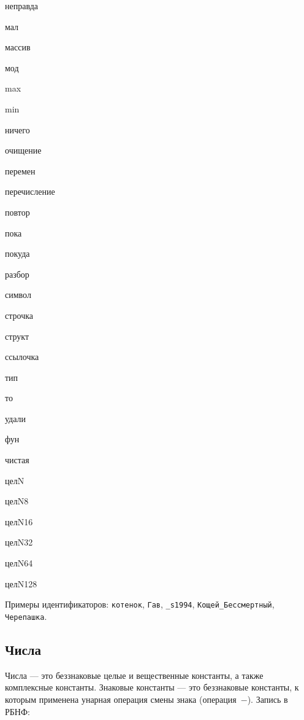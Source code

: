 \documentclass[10pt]{report}
\begin{document}
\begin{multicols}{4}
неправда

мал

массив

мод

max

min

ничего

очищение

перемен

перечисление

повтор

пока

покуда

разбор

символ

строчка

структ

ссылочка

тип

то

удали

фун

чистая

целN

целN8

целN16

целN32

целN64

целN128
\end{multicols}

Примеры идентификаторов: \texttt{котенок}, \texttt{Гав}, \texttt{_s1994}, \texttt{Кощей_Бессмертный}, \texttt{Черепашка}.    


        \subsection{Числа}
Числа --- это беззнаковые целые и вещественные константы, а также комплексные константы. Знаковые константы --- это беззнаковые константы, к которым применена унарная операция смены знака
(операция\ \glqq$-$\grqq). Запись в РБНФ:
\end{document}
